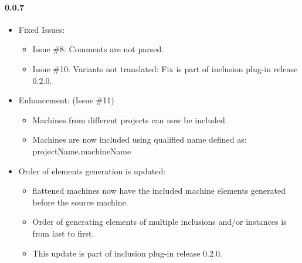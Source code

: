 \paragraph{0.0.7}
\begin{itemize}
	\item Fixed Issues:
	\begin{itemize}
		\item Issue \#8: Comments are not parsed.
		\item Issue \#10: Variants not translated: Fix is part of inclusion plug-in release 0.2.0.
	\end{itemize}
	\item Enhancement: (Issue \#11)
	\begin{itemize}
		\item Machines from different projects can now be included.
		\item Machines are now included using qualified name defined as: projectName.machineName
	\end{itemize}
	\item Order of elements generation is updated:
	\begin{itemize}
		\item flattened machines now have the included machine elements generated before the source machine.
		\item Order of generating elements of multiple inclusions and/or instances is from last to first.
		\item This update is part of inclusion plug-in release 0.2.0.
	\end{itemize}
\end{itemize}

